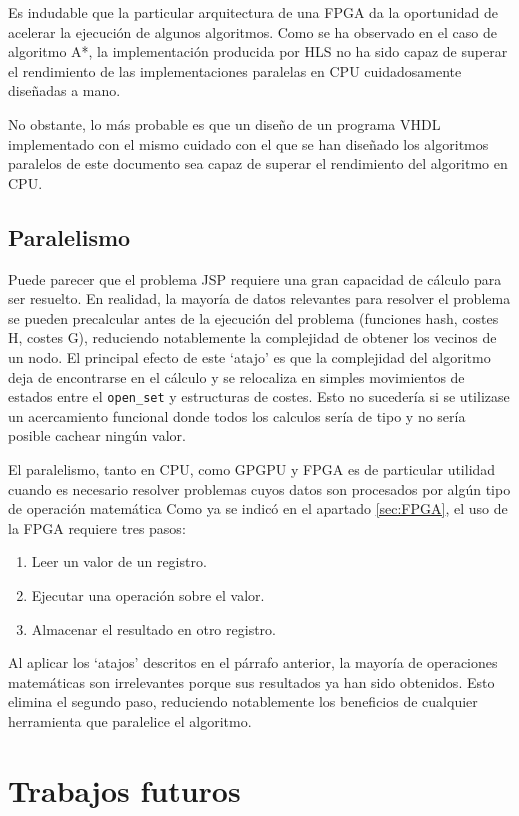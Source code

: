 Es indudable que la particular arquitectura de una FPGA
da la oportunidad de acelerar la ejecución de algunos algoritmos.
Como se ha observado en el caso de algoritmo A*,
la implementación producida por HLS no ha sido capaz de
superar el rendimiento de las implementaciones
paralelas en CPU cuidadosamente diseñadas a mano.

No obstante, lo más probable es que un diseño de un programa VHDL
implementado con el mismo cuidado con el que se han diseñado
los algoritmos paralelos de este documento sea capaz de
superar el rendimiento del algoritmo en CPU.

\subsection{Paralelismo}

Puede parecer que el problema JSP requiere una gran capacidad de cálculo
para ser resuelto.
En realidad, la mayoría de datos relevantes para resolver el problema
se pueden precalcular antes de la ejecución del problema
(funciones hash, costes H, costes G),
reduciendo notablemente la complejidad de obtener los vecinos
de un nodo.
El principal efecto de este `atajo' es que la complejidad del algoritmo
deja de encontrarse en el cálculo y se relocaliza en simples movimientos
de estados entre el \lstinline{open_set} y estructuras de costes.
Esto no sucedería si se utilizase un acercamiento funcional
donde todos los calculos sería de tipo 
y no sería posible cachear ningún valor.

El paralelismo, tanto en CPU, como GPGPU y FPGA es de particular
utilidad cuando es necesario resolver problemas cuyos datos
son procesados por algún tipo de operación matemática
Como ya se indicó en el apartado \ref{sec:FPGA},
el uso de la FPGA requiere tres pasos:
\begin{enumerate}[itemsep=0.25px]
    \item Leer un valor de un registro.
    \item Ejecutar una operación sobre el valor.
    \item Almacenar el resultado en otro registro.
\end{enumerate}
Al aplicar los `atajos' descritos en el párrafo anterior,
la mayoría de operaciones matemáticas son irrelevantes porque sus resultados
ya han sido obtenidos.
Esto elimina el segundo paso,
reduciendo notablemente los beneficios de cualquier
herramienta que paralelice el algoritmo.

\pagebreak
\section{Trabajos futuros}

